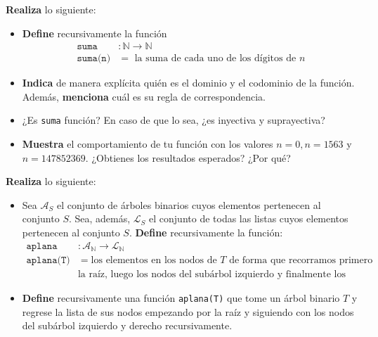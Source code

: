\documentclass[oneside]{style}
\begin{document}
\begin{questions}[label=\protect\circled{\bfseries\arabic*}]
    \question
    {
        \textbf{Realiza} lo siguiente:
        \begin{itemize}
            \item \textbf{Define} recursivamente la función 
            \begin{align*}
                \texttt{suma}&: \mathbb{N} \rightarrow \mathbb{N} \\  
                \texttt{suma(n)} &= \text{ la suma de cada uno de los dígitos 
                de } n
            \end{align*} 

            \item \textbf{Indica} de manera explícita quién es el dominio y el 
            codominio de la función. Además, \textbf{menciona} cuál es su regla 
            de correspondencia.

            \item ¿Es \texttt{suma} función? En caso de que lo sea, ¿es 
            inyectiva y suprayectiva?

            \item \textbf{Muestra} el comportamiento de tu función con los 
            valores $n = 0, n = 1563$ y $n = 147852369$. ¿Obtienes los 
            resultados esperados? ¿Por qué?
        \end{itemize}
    }

    \newpage
    \question
    {
        \textbf{Realiza} lo siguiente:
        \begin{itemize}
            \item Sea $\mathcal{A}_S$ el conjunto de árboles binarios cuyos 
            elementos pertenecen al conjunto $S$. Sea, además, $\mathcal{L}_S$ 
            el conjunto de todas las listas cuyos elementos pertenecen al 
            conjunto $S$. \textbf{Define} recursivamente la función:
            \begin{align*}
                \texttt{aplana}&: \mathcal{A}_\mathbb{N} \rightarrow 
                \mathcal{L}_\mathbb{N} \\ 
                \texttt{aplana(T)}  &= \text{los elementos en los nodos de } T 
                \text{ de forma que recorramos primero } \\ &\text{la raíz, 
                luego los nodos del subárbol izquierdo y finalmente los del 
                subárbol derecho}
            \end{align*} 

            \item \textbf{Define} recursivamente una función \texttt{aplana(T)} 
            que tome un árbol binario $T$ y regrese la lista de sus nodos 
            empezando por la raíz y siguiendo con los nodos del subárbol 
            izquierdo y derecho recursivamente.  


\end{itemize}}
\end{questions}
\end{document}

